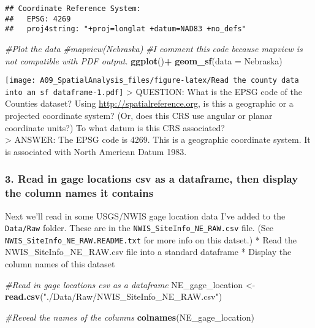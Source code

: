 \documentclass[]{article}
\newenvironment{Shaded}{\begin{snugshade}}{\end{snugshade}}
\newcommand{\KeywordTok}[1]{\textcolor[rgb]{0.13,0.29,0.53}{\textbf{#1}}}
\newcommand{\DataTypeTok}[1]{\textcolor[rgb]{0.13,0.29,0.53}{#1}}
\newcommand{\StringTok}[1]{\textcolor[rgb]{0.31,0.60,0.02}{#1}}
\newcommand{\CommentTok}[1]{\textcolor[rgb]{0.56,0.35,0.01}{\textit{#1}}}
\newcommand{\OperatorTok}[1]{\textcolor[rgb]{0.81,0.36,0.00}{\textbf{#1}}}
\newcommand{\NormalTok}[1]{#1}
\begin{document}
\begin{verbatim}
## Coordinate Reference System:
##   EPSG: 4269 
##   proj4string: "+proj=longlat +datum=NAD83 +no_defs"
\end{verbatim}

\begin{Shaded}
\begin{Highlighting}[]
\CommentTok{#Plot the data}
\CommentTok{#mapview(Nebraska)}
\CommentTok{#I comment this code because mapview is not compatible with PDF output.}
\KeywordTok{ggplot}\NormalTok{()}\OperatorTok{+}
\StringTok{  }\KeywordTok{geom_sf}\NormalTok{(}\DataTypeTok{data =}\NormalTok{ Nebraska)}
\end{Highlighting}
\end{Shaded}

\texttt{[image: A09\_SpatialAnalysis\_files/figure-latex/Read the county data into an sf dataframe-1.pdf]}
\textgreater{} QUESTION: What is the EPSG code of the Counties dataset?
Using \url{http://spatialreference.org}, is this a geographic or a
projected coordinate system? (Or, does this CRS use angular or planar
coordinate units?) To what datum is this CRS associated?\\
\textgreater{} ANSWER: The EPSG code is 4269. This is a geographic
coordinate system. It is associated with North American Datum 1983.

\subsubsection{3. Read in gage locations csv as a dataframe, then
display the column names it
contains}\label{read-in-gage-locations-csv-as-a-dataframe-then-display-the-column-names-it-contains}

Next we'll read in some USGS/NWIS gage location data I've added to the
\texttt{Data/Raw} folder. These are in the
\texttt{NWIS\_SiteInfo\_NE\_RAW.csv} file. (See
\texttt{NWIS\_SiteInfo\_NE\_RAW.README.txt} for more info on this
datset.) * Read the NWIS\_SiteInfo\_NE\_RAW.csv file into a standard
dataframe * Display the column names of this dataset

\begin{Shaded}
\begin{Highlighting}[]
\CommentTok{#Read in gage locations csv as a dataframe}
\NormalTok{NE_gage_location <-}\StringTok{ }\KeywordTok{read.csv}\NormalTok{(}\StringTok{"./Data/Raw/NWIS_SiteInfo_NE_RAW.csv"}\NormalTok{)}

\CommentTok{#Reveal the names of the columns}
\KeywordTok{colnames}\NormalTok{(NE_gage_location)}
\end{Highlighting}
\end{Shaded}
\end{document}
